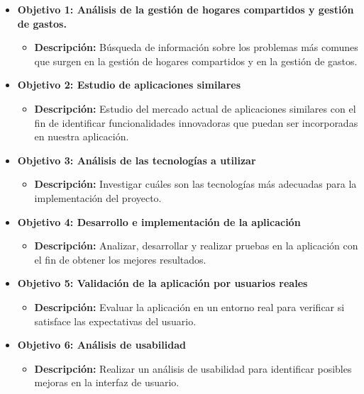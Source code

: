 \begin{itemize}
	\item\textbf{Objetivo 1: Análisis de la gestión de hogares compartidos y gestión de gastos.}
	\begin{itemize}
		\item \textbf{Descripción:} Búsqueda de información sobre los problemas más comunes que surgen en la gestión de hogares compartidos y en la gestión de gastos.
	\end{itemize} 

	\item \textbf{Objetivo 2: Estudio de aplicaciones similares}
	\begin{itemize}
		\item \textbf{Descripción:} Estudio del mercado actual de aplicaciones similares con el fin de identificar funcionalidades innovadoras que puedan ser incorporadas en nuestra aplicación.
	\end{itemize}

	\item \textbf{Objetivo 3: Análisis de las tecnologías a utilizar}
	\begin{itemize}
		\item \textbf{Descripción:} Investigar cuáles son las tecnologías más adecuadas para la implementación del proyecto.
	\end{itemize}
	
	\item \textbf{Objetivo 4: Desarrollo e implementación de la aplicación}
	\begin{itemize}
		\item \textbf{Descripción:} Analizar, desarrollar y realizar pruebas en la aplicación con el fin de obtener los mejores resultados.
	\end{itemize}
	
	\item \textbf{Objetivo 5: Validación de la aplicación por usuarios reales}
	\begin{itemize}
		\item \textbf{Descripción:} Evaluar la aplicación en un entorno real para verificar si satisface las expectativas del usuario.
	\end{itemize}
    \item \textbf{Objetivo 6: Análisis de usabilidad}
    \begin{itemize}
        \item \textbf{Descripción:} Realizar un análisis de usabilidad para identificar posibles mejoras en la interfaz de usuario.
    \end{itemize}
\end{itemize}

